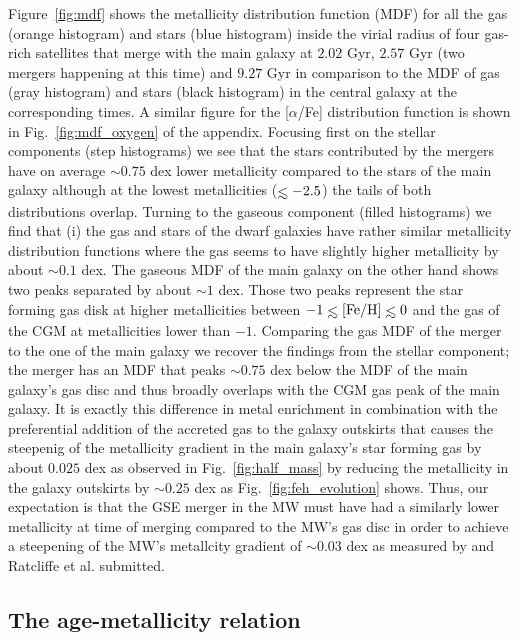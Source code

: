 \documentclass[useAMS,usenatbib]{mnras}
\def\lesssim{\mathrel{\hbox{\rlap{\hbox{\lower4pt\hbox{$\sim$}}}\hbox{$<$}}}}
\begin{document}
 Figure~\ref{fig:mdf} shows the metallicity distribution function (MDF) for all the gas (orange histogram) and stars (blue histogram) inside the virial radius of four gas-rich satellites that merge with the main galaxy at $2.02$ Gyr, $2.57$ Gyr (two mergers happening at this time) and $9.27$ Gyr in comparison to the MDF of gas (gray histogram) and stars (black histogram) in the central galaxy at the corresponding times. A similar figure for the [$\alpha$/Fe] distribution function is shown in Fig.~\ref{fig:mdf_oxygen} of the appendix. Focusing first on the stellar components (step histograms) we see that the stars contributed by the mergers have on average $\sim0.75$ dex lower metallicity compared to the stars of the main galaxy although at the lowest metallicities ($\lesssim-2.5$) the tails of both distributions overlap. Turning to the gaseous component (filled histograms) we find that (i) the gas and stars of the dwarf galaxies have rather similar metallicity distribution functions where the gas seems to have slightly higher metallicity by about $\sim0.1$ dex. The gaseous MDF of the main galaxy on the other hand shows two peaks separated by about $\sim1$ dex. Those two peaks represent the star forming gas disk at higher metallicities between $-1\lesssim \rm{[Fe/H]}\lesssim0$ and the gas of the CGM at metallicities lower than $-1$. Comparing the gas MDF of the merger to the one of the main galaxy we recover the findings from the stellar component; the merger has an MDF that peaks $\sim0.75$ dex below the MDF of the main galaxy's gas disc and thus broadly overlaps with the CGM gas peak of the main galaxy. It is exactly this difference in metal enrichment in combination with the preferential addition of the accreted gas to the galaxy outskirts that causes the steepenig of the metallicity gradient in the main galaxy's star forming gas by about $0.025$ dex as observed in Fig.~\ref{fig:half_mass} by reducing the metallicity in the galaxy outskirts by $\sim0.25$ dex as Fig.~\ref{fig:feh_evolution} shows. Thus, our expectation is that the GSE merger in the MW must have had a similarly lower metallicity at time of merging compared to the MW's gas disc in order to achieve a steepening of the MW's metallcity gradient of $\sim0.03$ dex as measured by \cite{Lu2022b} and Ratcliffe et al. submitted.


\subsection{The age-metallicity relation}
\label{sec:age_fe}
\end{document}
